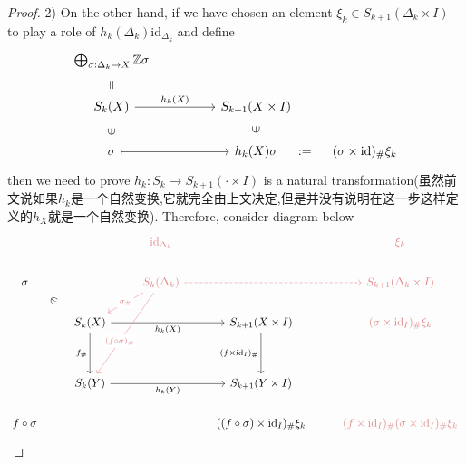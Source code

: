 \documentclass{article}
\begin{document}
\begin{proof}
    2) On the other hand, if we have chosen an element $\xi_k \in S_{k+1}(\Delta_k \times I)$ to play a role of $h_k(\Delta_k) \text{id}_{\Delta_k}$ and define 
    \[\begin{tikzcd}
        {\bigoplus_{\sigma : \Delta_k \to X}\Z \sigma} \\
        {S_k(X)} && {S_{k+1}(X \times I)} \\
        \sigma && {h_k(X)\sigma} & {(\sigma \times \text{id})_\# \xi_k}
        \arrow["{=}"{marking}, draw=none, from=1-1, to=2-1]
        \arrow["{h_k(X)}", from=2-1, to=2-3]
        \arrow[maps to, from=3-1, to=3-3]
        \arrow["\in"{marking}, draw=none, from=3-1, to=2-1]
        \arrow["\in"{marking}, draw=none, from=3-3, to=2-3]
        \arrow["{ := }"{marking}, draw=none, from=3-3, to=3-4]
    \end{tikzcd}\]
    then we need to prove $h_k : S_k \to S_{k+1}(\cdot \times I)$ is a natural transformation(虽然前文说如果$h_k$是一个自然变换,它就完全由上文决定,但是并没有说明在这一步这样定义的$h_X$就是一个自然变换). Therefore, consider diagram below
    \[\begin{tikzcd}
        && \textcolor{rgb,255:red,224;green,133;blue,133}{\text{id}_{\Delta_k}} && \textcolor{rgb,255:red,224;green,133;blue,133}{\xi_k} \\
        \sigma && \textcolor{rgb,255:red,224;green,133;blue,133}{S_k(\Delta_k)} && \textcolor{rgb,255:red,224;green,133;blue,133}{S_{k+1}(\Delta_k \times I)} \\
        & {S_k(X)} && {S_{k+1}(X \times I)} & \textcolor{rgb,255:red,224;green,133;blue,133}{(\sigma \times \text{id}_I)_\# \xi_k} \\
        \\
        & {S_k(Y)} && {S_{k+1}(Y \times I)} \\
        {f \circ \sigma} &&& {((f \circ \sigma) \times \text{id}_I)_\# \xi_k} & \textcolor{rgb,255:red,224;green,133;blue,133}{(f \times \text{id}_I)_\#(\sigma \times \text{id}_I)_\# \xi_k}
        \arrow["{h_k(X)}"', from=3-2, to=3-4]
        \arrow["{h_k(Y)}"', from=5-2, to=5-4]
        \arrow["{f_\#}"', from=3-2, to=5-2]
        \arrow["{(f \times \text{id}_I)_\#}"', from=3-4, to=5-4]
        \arrow["\in"{marking}, draw=none, from=2-1, to=3-2]
        \arrow["{\sigma_\#}"{description}, color={rgb,255:red,224;green,133;blue,133}, from=2-3, to=3-2]
        \arrow["{(f \circ \sigma)_\#}"{description, pos=0.6}, color={rgb,255:red,224;green,133;blue,133}, from=2-3, to=5-2]
        \arrow[color={rgb,255:red,224;green,133;blue,133}, dashed, from=2-3, to=2-5]

\end{tikzcd}\]
\end{proof}
\end{document}
